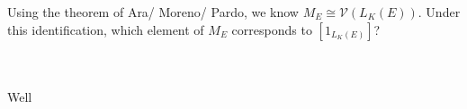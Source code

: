 Using the theorem of Ara/ Moreno/ Pardo, we know $M_E\cong\mathcal{V}(L_K(E))$. Under this
identification, which element of $M_E$ corresponds to $[1_{L_K(E)}]$?\\\\

\begin{solution}\renewcommand{\qedsymbol}{}\ \\
    Well
\end{solution}